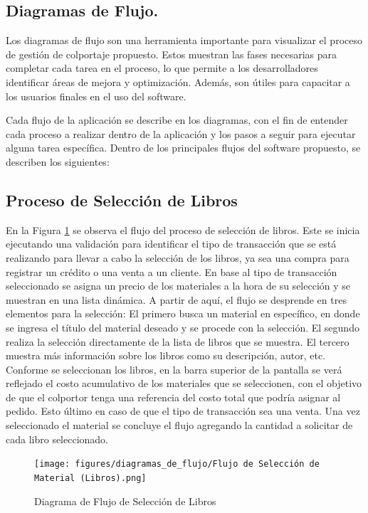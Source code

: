 \documentclass[runningheads]{llncs}
\begin{document}
        \subsection{Diagramas de Flujo.}
            Los diagramas de flujo son una herramienta importante para visualizar el proceso de gestión de colportaje propuesto. Estos muestran las fases necesarias para completar cada tarea en el proceso, lo que permite a los desarrolladores identificar áreas de mejora y optimización. Además, son útiles para capacitar a los usuarios finales en el uso del software.

            Cada flujo de la aplicación se describe en los diagramas, con el fin de entender cada proceso a realizar dentro de la aplicación y los pasos a seguir para ejecutar alguna tarea específica.
            Dentro de los principales flujos del software propuesto, se describen los siguientes:


            \subsection*{Proceso de Selección de Libros}
                En la Figura \ref{fig2} se observa el flujo del proceso de selección de libros.
                Este se inicia ejecutando una validación para identificar el tipo de transacción que se está realizando para llevar a cabo la selección de los libros, ya sea una compra para registrar un crédito o una venta a un cliente.
                En base al tipo de transacción seleccionado se asigna un precio de los materiales a la hora de su selección y se muestran en una lista dinámica.
                A partir de aquí, el flujo se desprende en tres elementos para la selección: El primero busca un material en específico, en donde se ingresa el título del material deseado y se procede con la selección. El segundo realiza la selección directamente de la lista de libros que se muestra. El tercero muestra más información sobre los libros como su descripción, autor, etc.
                Conforme se seleccionan los libros, en la barra superior de la pantalla se verá reflejado el costo acumulativo de los materiales que se seleccionen, con el objetivo de que el colportor tenga una referencia del costo total que podría asignar al pedido. Esto último en caso de que el tipo de transacción sea una venta.
                Una vez seleccionado el material se concluye el flujo agregando la cantidad a solicitar de cada libro seleccionado.
                \begin{figure}[H]
                    \centering\captionsetup{width=0.8\textwidth}
                    \texttt{[image: figures/diagramas\_de\_flujo/Flujo de Selección de Material (Libros).png]}
                    \caption{Diagrama de Flujo de Selección de Libros} \label{fig2}
                \end{figure}
\end{document}
